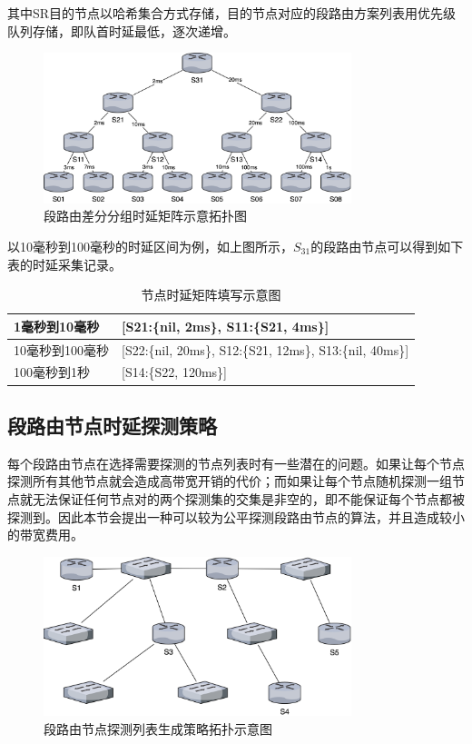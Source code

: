 其中SR目的节点以哈希集合方式存储，目的节点对应的段路由方案列表用优先级队列存储，即队首时延最低，逐次递增。

\begin{figure}[htbp]
\setlength{\abovecaptionskip}{15pt plus 3pt minus 2pt}
\centerline{\includegraphics[width=0.8\textwidth]{./figures/ch4-tree-topo.png}}
\caption{段路由差分分组时延矩阵示意拓扑图}
\label{fig-ch4-tree-topo}
\end{figure}

以10毫秒到100毫秒的时延区间为例，如上图所示，$S_{31}$的段路由节点可以得到如下表的时延采集记录。

\begin{table}[htbp]
\begin{tabular}{|p{}|p{}|}
\hline
1毫秒到10毫秒 & {[}S21:\{nil, 2ms\}, S11:\{S21, 4ms\}{]} \\ \hline
10毫秒到100毫秒 & {[}S22:\{nil, 20ms\}, S12:\{S21, 12ms\}, S13:\{nil, 40ms\}{]} \\ \hline
100毫秒到1秒 & {[}S14:\{S22, 120ms\}{]} \\ \hline
\end{tabular}
\caption{节点时延矩阵填写示意图}
\label{table-fullin-delay-metric}
\end{table}

\subsection{段路由节点时延探测策略}

每个段路由节点在选择需要探测的节点列表时有一些潜在的问题。如果让每个节点探测所有其他节点就会造成高带宽开销的代价；而如果让每个节点随机探测一组节点就无法保证任何节点对的两个探测集的交集是非空的，即不能保证每个节点都被探测到。因此本节会提出一种可以较为公平探测段路由节点的算法，并且造成较小的带宽费用。

\begin{figure}[htbp]
\setlength{\abovecaptionskip}{15pt plus 3pt minus 2pt}
\centerline{\includegraphics[width=0.8\textwidth]{./figures/ch4-random-topo.png}}
\caption{段路由节点探测列表生成策略拓扑示意图}
\label{fig-ch4-random-topo}
\end{figure}

